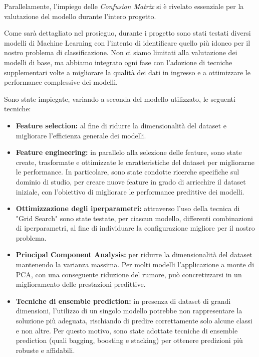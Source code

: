 \documentclass{article}
\begin{document}
\begin{multicols}{2}
Parallelamente, l'impiego delle \textit{Confusion Matrix} si è rivelato essenziale per la valutazione del modello durante l'intero progetto.

Come sarà dettagliato nel prosieguo, durante i progetto sono stati testati diversi modelli di Machine Learning con l'intento di identificare quello pi\`u idoneo per il nostro problema di classificazione. 
Non ci siamo limitati alla valutazione dei modelli di base, ma abbiamo integrato ogni fase con l'adozione di tecniche supplementari volte a migliorare la qualità dei dati in ingresso e a ottimizzare le performance complessive dei modelli. 

Sono state impiegate, variando a seconda del modello utilizzato, le seguenti tecniche:

\begin{itemize}[leftmargin=*]
    \item \textbf{Feature selection:}
    al fine di ridurre la dimensionalità del dataset e migliorare l'efficienza generale dei modelli.
    
    \item \textbf{Feature engineering:} 
    in parallelo alla selezione delle feature, sono state create, trasformate e ottimizzate le caratteristiche del dataset per migliorarne le performance. 
    In particolare, sono state condotte ricerche specifiche sul dominio di studio, per creare nuove feature in grado di arricchire il dataset iniziale, con l'obiettivo di migliorare le performance predittive dei modelli.
    
    \item \textbf{Ottimizzazione degli iperparametri:} 
    attraverso l'uso della tecnica di "Grid Search" sono state testate, per ciascun modello, differenti combinazioni di iperparametri, al fine di individuare la configurazione migliore per il nostro problema.
    
    \item \textbf{Principal Component Analysis:} 
    per ridurre la dimensionalità del dataset mantenendo la varianza massima. 
    Per molti modelli l'applicazione a monte di PCA, con una conseguente riduzione del rumore, pu\`o  concretizzarsi in un miglioramento delle prestazioni predittive.
    
    \item \textbf{Tecniche di ensemble prediction:} 
    in presenza di dataset di grandi dimensioni, l'utilizzo di un singolo modello potrebbe non rappresentare la soluzione più adeguata, rischiando di predire correttamente solo alcune classi e non altre. 
    Per questo motivo, sono state adottate tecniche di ensemble prediction (quali bagging, boosting e stacking) per ottenere predizioni più robuste e affidabili.
    

\end{itemize}
\end{multicols}
\end{document}

